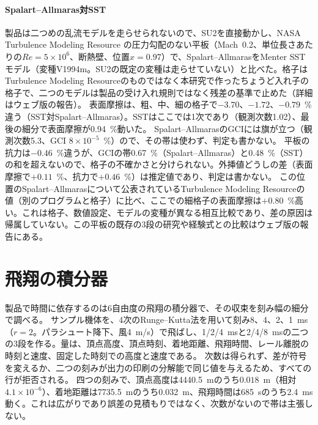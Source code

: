 \documentclass[twocolumn]{labreport}
\begin{document}
\paragraph{Spalart--Allmaras対SST}
\label{sec:model}
製品は二つめの乱流モデルを走らせられないので、SU2を直接動かし、NASA Turbulence Modeling Resource \citep{tmr}の圧力勾配のない平板（Mach~0.2、単位長さあたりの$Re=5\times10^{6}$、断熱壁、位置$x=0.97$）で、Spalart--AllmarasをMenter SSTモデル（変種V1994m。SU2の既定の変種は走らせていない）と比べた。格子はTurbulence Modeling Resourceのものではなく本研究で作ったちょうど入れ子の格子で、二つのモデルは製品の受け入れ規則ではなく残差の基準で止めた（詳細はウェブ版の報告）。
表面摩擦は、粗、中、細の格子で$-3.70$、$-1.72$、$-0.79$~\%違う（SST対Spalart--Allmaras）。SSTはここでは1次であり（観測次数1.02）、最後の細分で表面摩擦が0.94~\%動いた。
Spalart--AllmarasのGCIには旗が立つ（観測次数5.3、GCI $8\times10^{-5}$~\%）ので、その帯は使わず、判定も書かない。
平板の抗力は$-0.46$~\%違うが、GCIの帯0.67~\%（Spalart--Allmaras）と0.48~\%（SST）の和を超えないので、格子の不確かさと分けられない。外挿値どうしの差（表面摩擦で$+0.11$~\%、抗力で$+0.46$~\%）は推定値であり、判定は書かない。
この位置のSpalart--Allmarasについて公表されているTurbulence Modeling Resourceの値（別のプログラムと格子）に比べ、ここでの細格子の表面摩擦は$+0.80$~\%高い。これは格子、数値設定、モデルの変種が異なる相互比較であり、差の原因は帰属していない。この平板の既存の3段の研究や経験式との比較はウェブ版の報告にある。

\section{飛翔の積分器}
\label{sec:temporalapp}

製品で時間に依存するのは6自由度の飛翔の積分器で、その収束を刻み幅の細分で調べる。
サンプル機体を、4次のRunge--Kutta法を用いて刻み8、4、2、1~ms（$r=2$。パラシュート降下、風4~m/s）で飛ばし、1/2/4~msと2/4/8~msの二つの3段を作る。量は、頂点高度、頂点時刻、着地距離、飛翔時間、レール離脱の時刻と速度、固定した時刻での高度と速度である。
次数は得られず、差が符号を変えるか、二つの刻みが出力の印刷の分解能で同じ値を与えるため、すべての行が拒否される。
四つの刻みで、頂点高度は4440.5~mのうち$0.018$~m（相対$4.1\times10^{-6}$）、着地距離は7735.5~mのうち0.032~m、飛翔時間は685~sのうち2.4~ms動く。これは広がりであり誤差の見積もりではなく、次数がないので帯は主張しない。
\end{document}
